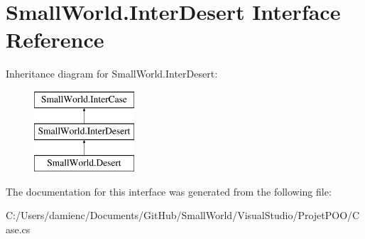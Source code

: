 \hypertarget{interface_small_world_1_1_inter_desert}{\section{Small\-World.\-Inter\-Desert Interface Reference}
\label{interface_small_world_1_1_inter_desert}
}
Inheritance diagram for Small\-World.\-Inter\-Desert\-:\begin{figure}[H]
\begin{center}
\leavevmode
\includegraphics[height=3.000000cm]{interface_small_world_1_1_inter_desert}
\end{center}
\end{figure}


The documentation for this interface was generated from the following file\-:\begin{DoxyCompactItemize}
\item 
C\-:/\-Users/damienc/\-Documents/\-Git\-Hub/\-Small\-World/\-Visual\-Studio/\-Projet\-P\-O\-O/Case.\-cs\end{DoxyCompactItemize}
